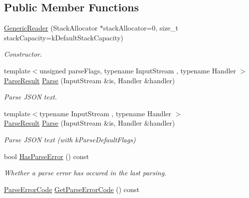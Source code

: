 \subsection*{Public Member Functions}
\begin{DoxyCompactItemize}
\item 
\hyperlink{classGenericReader_aab875a34b3092df9fb4e2b8eac6dbb96}{Generic\+Reader} (Stack\+Allocator $\ast$stack\+Allocator=0, size\+\_\+t stack\+Capacity=k\+Default\+Stack\+Capacity)
\begin{DoxyCompactList}\small\item\em Constructor. \end{DoxyCompactList}\item 
{\footnotesize template$<$unsigned parse\+Flags, typename Input\+Stream , typename Handler $>$ }\\\hyperlink{structParseResult}{Parse\+Result} \hyperlink{classGenericReader_a0c450620d14ff1824e58bb7bd9b42099}{Parse} (Input\+Stream \&is, Handler \&handler)
\begin{DoxyCompactList}\small\item\em Parse J\+S\+ON text. \end{DoxyCompactList}\item 
{\footnotesize template$<$typename Input\+Stream , typename Handler $>$ }\\\hyperlink{structParseResult}{Parse\+Result} \hyperlink{classGenericReader_a76d91e5fd8dfe48aea7dd6d8a51dd6dc}{Parse} (Input\+Stream \&is, Handler \&handler)
\begin{DoxyCompactList}\small\item\em Parse J\+S\+ON text (with k\+Parse\+Default\+Flags) \end{DoxyCompactList}\item 
\mbox{\label{classGenericReader_ac417441794477ea747b63adb6d3653a9}} 
bool \hyperlink{classGenericReader_ac417441794477ea747b63adb6d3653a9}{Has\+Parse\+Error} () const
\begin{DoxyCompactList}\small\item\em Whether a parse error has occured in the last parsing. \end{DoxyCompactList}\item 
\mbox{\label{classGenericReader_a937bf90919f50e1c370b312cee5833e8}} 
\hyperlink{group__RAPIDJSON__ERRORS_ga8d4b32dfc45840bca189ade2bbcb6ba7}{Parse\+Error\+Code} \hyperlink{classGenericReader_a937bf90919f50e1c370b312cee5833e8}{Get\+Parse\+Error\+Code} () const

\end{DoxyCompactItemize}
